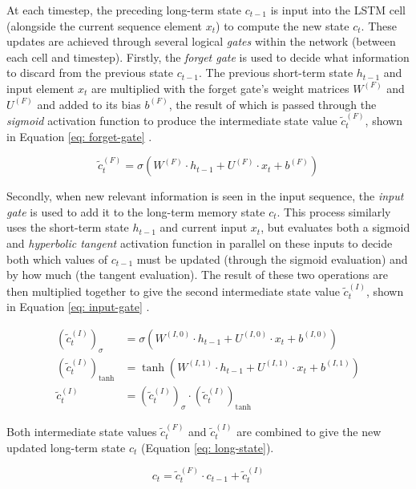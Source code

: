 \documentclass[a4paper, 11pt]{report}
\begin{document}
    At each timestep, the preceding long-term state $c_{t-1}$ is input into the LSTM cell (alongside the current sequence element $x_t$) to compute the new state $c_t$. These updates are achieved through several logical \emph{gates} within the network (between each cell and timestep). Firstly, the \emph{forget gate} is used to decide what information to discard from the previous state $c_{t-1}$. The previous short-term state $h_{t-1}$ and input element $x_t$ are multiplied with the forget gate's weight matrices $W^{(F)}$ and $U^{(F)}$ and added to its bias $b^{(F)}$, the result of which is passed through the \emph{sigmoid} activation function to produce the intermediate state value $\tilde{c}^{(F)}_t$, shown in Equation \ref{eq: forget-gate} \citep{zhang-2021}.

    \begin{equation}
        \label{eq: forget-gate}
        \tilde{c}^{(F)}_t = \sigma( W^{(F)} \cdot h_{t-1} + U^{(F)} \cdot x_t + b^{(F)} )
    \end{equation}

    Secondly, when new relevant information is seen in the input sequence, the \emph{input gate} is used to add it to the long-term memory state $c_t$. This process similarly uses the short-term state $h_{t-1}$ and current input $x_t$, but evaluates both a sigmoid and \emph{hyperbolic tangent} activation function in parallel on these inputs to decide both which values of $c_{t-1}$ must be updated (through the sigmoid evaluation) and by how much (the tangent evaluation). The result of these two operations are then multiplied together to give the second intermediate state value $\tilde{c}^{(I)}_t$, shown in Equation \ref{eq: input-gate} \citep{zhang-2021}.

    \begin{align}
        \label{eq: input-gate}
        (\tilde{c}^{(I)}_t)_{\sigma} &= \sigma( W^{(I,0)} \cdot h_{t-1} + U^{(I,0)} \cdot x_t + b^{(I,0)} ) \\
        (\tilde{c}^{(I)}_t)_{\tanh} &= \tanh{( W^{(I,1)} \cdot h_{t-1} + U^{(I,1)} \cdot x_t + b^{(I,1)} )} \\
        \tilde{c}^{(I)}_t &= (\tilde{c}^{(I)}_t)_{\sigma} \cdot (\tilde{c}^{(I)}_t)_{\tanh}
    \end{align}

    Both intermediate state values $\tilde{c}^{(F)}_t$ and $\tilde{c}^{(I)}_t$ are combined to give the new updated long-term state $c_t$ (Equation \ref{eq: long-state}).

    \begin{equation}
        \label{eq: long-state}
        c_t = \tilde{c}^{(F)}_t \cdot c_{t-1} + \tilde{c}^{(I)}_t
    \end{equation}
\end{document}
